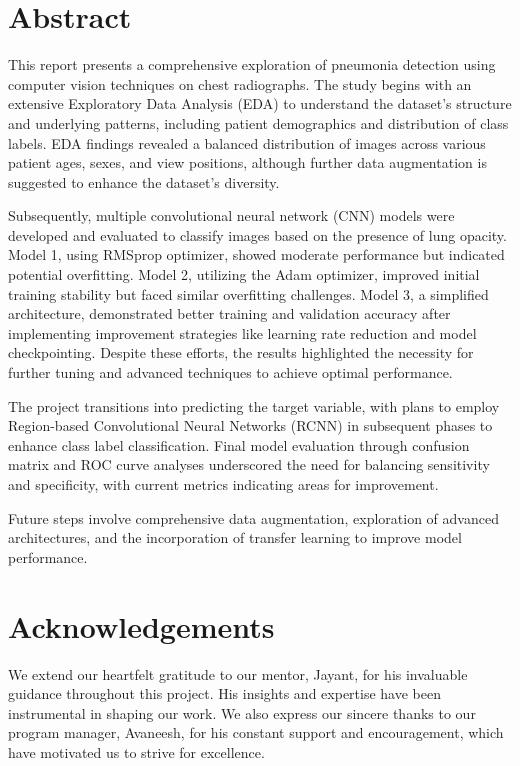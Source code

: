 \documentclass[11pt]{report}
\begin{document}
\maketitle

\chapter*{Abstract}

This report presents a comprehensive exploration of pneumonia detection using computer vision techniques on chest radiographs. The study begins with an extensive Exploratory Data Analysis (EDA) to understand the dataset's structure and underlying patterns, including patient demographics and distribution of class labels. EDA findings revealed a balanced distribution of images across various patient ages, sexes, and view positions, although further data augmentation is suggested to enhance the dataset's diversity.

Subsequently, multiple convolutional neural network (CNN) models were developed and evaluated to classify images based on the presence of lung opacity. Model 1, using RMSprop optimizer, showed moderate performance but indicated potential overfitting. Model 2, utilizing the Adam optimizer, improved initial training stability but faced similar overfitting challenges. Model 3, a simplified architecture, demonstrated better training and validation accuracy after implementing improvement strategies like learning rate reduction and model checkpointing. Despite these efforts, the results highlighted the necessity for further tuning and advanced techniques to achieve optimal performance.

The project transitions into predicting the target variable, with plans to employ Region-based Convolutional Neural Networks (RCNN) in subsequent phases to enhance class label classification. Final model evaluation through confusion matrix and ROC curve analyses underscored the need for balancing sensitivity and specificity, with current metrics indicating areas for improvement.

Future steps involve comprehensive data augmentation, exploration of advanced architectures, and the incorporation of transfer learning to improve model performance.
\vspace{2cm}

\chapter*{Acknowledgements}
We extend our heartfelt gratitude to our mentor, Jayant, for his invaluable guidance throughout this project. His insights and expertise have been instrumental in shaping our work. We also express our sincere thanks to our program manager, Avaneesh, for his constant support and encouragement, which have motivated us to strive for excellence.
\end{document}
